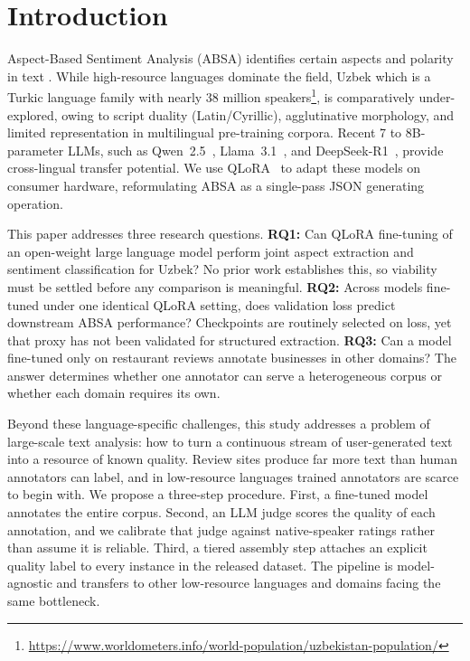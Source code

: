 \documentclass[bdcc,article,submit,moreauthors]{Definitions/mdpi}
\begin{document}

\section{Introduction}
\label{sec:introduction}
Aspect-Based Sentiment Analysis (ABSA) identifies certain aspects and polarity in text \cite{pontiki-etal-2014-semeval}. While high-resource languages dominate the field, Uzbek which is a Turkic language family with nearly 38 million speakers\footnote{\url{https://www.worldometers.info/world-population/uzbekistan-population/}}, is comparatively under-explored, owing to script duality (Latin/Cyrillic), agglutinative morphology, and limited representation in multilingual pre-training corpora. Recent 7 to 8B-parameter LLMs, such as Qwen~2.5~\cite{Qwen2024-kr}, Llama~3.1~\cite{Grattafiori2024-ka}, and DeepSeek-R1~\cite{Guo2025}, provide cross-lingual transfer potential. We use QLoRA~\cite{3666122.3666563} to adapt these models on consumer hardware, reformulating ABSA as a single-pass JSON generating operation.

This paper addresses three research questions. \textbf{RQ1:} Can QLoRA fine-tuning of an open-weight large language model perform joint aspect extraction and sentiment classification for Uzbek? No prior work establishes this, so viability must be settled before any comparison is meaningful. \textbf{RQ2:} Across models fine-tuned under one identical QLoRA setting, does validation loss predict downstream ABSA performance? Checkpoints are routinely selected on loss, yet that proxy has not been validated for structured extraction. \textbf{RQ3:} Can a model fine-tuned only on restaurant reviews annotate businesses in other domains? The answer determines whether one annotator can serve a heterogeneous corpus or whether each domain requires its own.

Beyond these language-specific challenges, this study addresses a problem of large-scale text analysis: how to turn a continuous stream of user-generated text into a resource of known quality. Review sites produce far more text than human annotators can label, and in low-resource languages trained annotators are scarce to begin with. We propose a three-step procedure. First, a fine-tuned model annotates the entire corpus. Second, an LLM judge scores the quality of each annotation, and we calibrate that judge against native-speaker ratings rather than assume it is reliable. Third, a tiered assembly step attaches an explicit quality label to every instance in the released dataset. The pipeline is model-agnostic and transfers to other low-resource languages and domains facing the same bottleneck.
\end{document}

